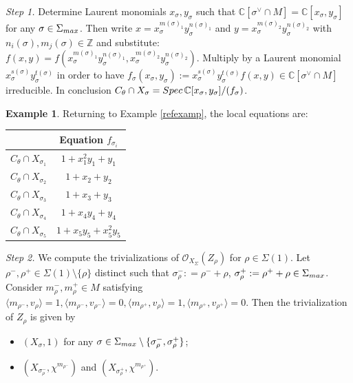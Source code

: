 \documentclass[11pt, reqno]{amsart}
\theoremstyle{plain}
\theoremstyle{definition}
\newtheorem{example}[theorem]{Example}
\theoremstyle{remark}
\begin{document}
\emph{Step 1.} 
Determine  Laurent monomials $x_{\sigma}, y_{\sigma}$ such that $\mathbb{C}[\sigma^{\vee}\cap M] =  \mathbb{C}[x_{\sigma}, y_{\sigma}]$ for any $\sigma\in \Sigma_{\rm max}$. Then 
write $x  =  x_{\sigma}^{m(\sigma)_{1}} y_{\sigma}^{n(\sigma)_{1}}$ and  $y  =  x_{\sigma}^{m(\sigma)_{2}} y_{\sigma}^{n(\sigma)_{2}}$ with $n_{i}(\sigma), m_{j}(\sigma)\in \mathbb{Z}$ and substitute: $f(x, y) =  f (x_{\sigma}^{m(\sigma)_{1}} y_{\sigma}^{n(\sigma)_{1}},  x_{\sigma}^{m(\sigma)_{2}} y_{\sigma}^{n(\sigma)_{2}})$. Multiply by a Laurent monomial $x_{\sigma}^{s(\sigma)} y_{\sigma}^{t(\sigma)}$ in order to have 
$f_{\sigma}(x_{\sigma}, y_{\sigma}):= x_{\sigma}^{s(\sigma)} y_{\sigma}^{t(\sigma)}f(x,y)\in \mathbb{C}[\sigma^{\vee}\cap M]$
irreducible.
In conclusion $C_{\theta}\cap X_{\sigma} =  {\rm Spec}\, \mathbb{C}[x_{\sigma}, y_{\sigma}]/(f_{\sigma})$. 
\begin{example}\label{refexamp01}
Returning to Example \ref{refexamp}, the local equations are:
\begin{center}
 \begin{tabular}{|c| c |} 
 \hline
  & Equation $f_{\sigma_{i}}$ \\ [1ex] 
 \hline\hline
 $C_{\theta}\cap X_{\sigma_{1}}$ & $1  + x_{1}^{2}y_{1} + y_{1}$ \\ [2ex] 
 \hline
 $C_{\theta}\cap X_{\sigma_{2}}$ & $1 + x_{2} + y_{2}$ \\  [2ex] 
 \hline
 $C_{\theta}\cap X_{\sigma_{3}}$ & $1 + x_{3} + y_{3}$ \\ [2ex] 
 \hline
 $C_{\theta}\cap X_{\sigma_{4}}$ & $1 + x_{4}y_{4}  + y_{4}$ \\ [2ex] 
 \hline
 $C_{\theta}\cap X_{\sigma_{5}}$ & $1 + x_{5}y_{5}  + x_{5}^{2}y_{5}$ \\  [2ex] 
 \hline
\end{tabular}
\end{center}
\end{example}
\emph{Step 2.} We compute the trivializations of  $\mathcal{O}_{X_{\Sigma}}(Z_{\rho})$ for $\rho\in \Sigma(1)$. Let $\rho^{-}, \rho^{+}\in \Sigma(1)\setminus \{\rho\}$ distinct such that 
$\sigma_{\rho}^{-}: =  \rho^{-} + \rho$,  $\sigma_{\rho}^{+} :=  \rho^{+}+\rho\in\Sigma_{\rm max}$. Consider $m_{\rho}^{-}, m_{\rho}^{+}\in M$ satisfying
$\langle m_{\rho^{-}}, v_{\rho}\rangle  = 1, \langle m_{\rho^{-}}, v_{\rho^{-}}\rangle  =  0,\langle m_{\rho^{+}}, v_{\rho}\rangle  = 1, \langle m_{\rho^{+}}, v_{\rho^{+}}\rangle  =  0.$
Then the trivialization of $Z_{\rho}$ is given by
\begin{itemize}
\item $(X_{\sigma}, 1)$ for any $\sigma \in \Sigma_{\rm max}\setminus \{\sigma_{\rho}^{-}, \sigma_{\rho}^{+}\}$;
\item $(X_{\sigma_{\rho}^{-}}, \chi^{m_{\rho^{-}}})$ and $(X_{\sigma_{\rho}^{+}}, \chi^{m_{\rho^{+}}}).$ 
\end{itemize}
\end{document}
